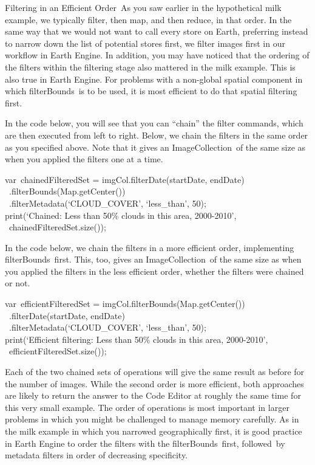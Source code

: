 \documentclass[
  letterpaper,
  DIV=11,
  numbers=noendperiod]{scrreprt}
\begin{document}
Filtering in an Efficient Order~As you saw earlier in the hypothetical
milk example, we typically filter, then map, and then reduce, in that
order. In the same way that we would not want to call every store on
Earth, preferring instead to narrow down the list of potential stores
first, we filter images first in our workflow in Earth Engine. In
addition, you may have noticed that the ordering of the filters within
the filtering stage also mattered in the milk example. This is also true
in Earth Engine. For problems with a non-global spatial component in
which filterBounds~is to be used, it is most efficient to do that
spatial filtering first.

In the code below, you will see that you can ``chain'' the filter
commands, which are then executed from left to right. Below, we chain
the filters in the same order as you specified above. Note that it gives
an ImageCollection~of the same size as when you applied the filters one
at a time.

var~chainedFilteredSet = imgCol.filterDate(startDate, endDate)\\
\hspace*{0.333em} ~.filterBounds(Map.getCenter())\\
\hspace*{0.333em} ~.filterMetadata(`CLOUD\_COVER', `less\_than', 50);\\
print(`Chained: Less than 50\% clouds in this area, 2000-2010',\\
\hspace*{0.333em} ~chainedFilteredSet.size());

In the code below, we chain the filters in a more efficient order,
implementing filterBounds~first. This, too, gives an ImageCollection~of
the same size as when you applied the filters in the less efficient
order, whether the filters were chained or not.

var~efficientFilteredSet = imgCol.filterBounds(Map.getCenter())\\
\hspace*{0.333em} ~.filterDate(startDate, endDate)\\
\hspace*{0.333em} ~.filterMetadata(`CLOUD\_COVER', `less\_than', 50);\\
print(`Efficient filtering: Less than 50\% clouds in this area,
2000-2010',\\
\hspace*{0.333em} ~efficientFilteredSet.size());

Each of the two chained sets of operations will give the same result as
before for the number of images. While the second order is more
efficient, both approaches are likely to return the answer to the Code
Editor at roughly the same time for this very small example. The order
of operations is most important in larger problems in which you might be
challenged to manage memory carefully. As in the milk example in which
you narrowed geographically first, it is good practice in Earth Engine
to order the filters with the filterBounds~first, followed~by metadata
filters in order of decreasing specificity.
\end{document}
